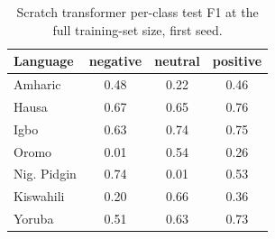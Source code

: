 \begin{table}[t]
\centering
\caption{Scratch transformer per-class test F1 at the full training-set size, first seed.}
\label{tab:scratch_per_class_f1_full}
\small
\begin{tabular}{lccc}
\toprule
Language & negative & neutral & positive \\
\midrule
Amharic & 0.48 & 0.22 & 0.46 \\
Hausa & 0.67 & 0.65 & 0.76 \\
Igbo & 0.63 & 0.74 & 0.75 \\
Oromo & 0.01 & 0.54 & 0.26 \\
Nig. Pidgin & 0.74 & 0.01 & 0.53 \\
Kiswahili & 0.20 & 0.66 & 0.36 \\
Yoruba & 0.51 & 0.63 & 0.73 \\
\bottomrule
\end{tabular}
\end{table}